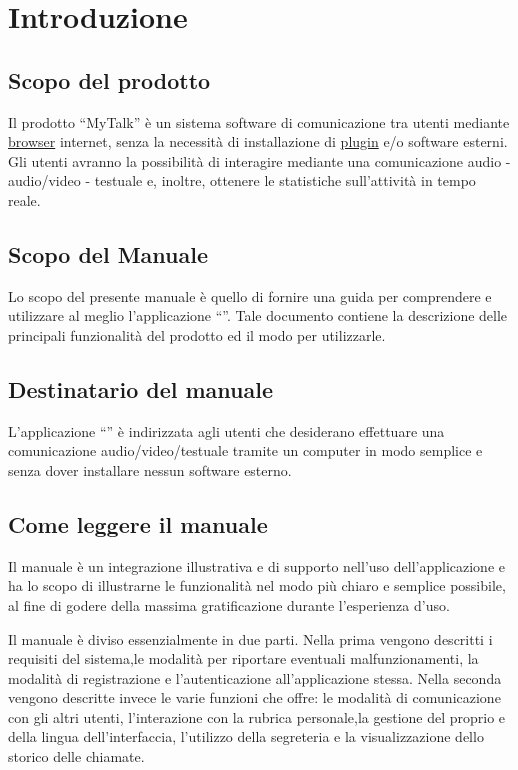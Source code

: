 


\setcounter{page}{1}
\pagestyle{normal}

\section{Introduzione}
\subsection{Scopo del prodotto}
Il prodotto ``MyTalk'' è un sistema software di comunicazione tra utenti mediante \underline{browser} internet, senza la necessità di installazione di \underline{plugin} e/o software esterni. Gli utenti avranno la possibilità di interagire mediante una comunicazione audio - audio/video - testuale e, inoltre, ottenere le statistiche sull'attività in tempo reale.

\subsection{Scopo del Manuale}
Lo scopo del presente manuale è quello di fornire una guida per comprendere e utilizzare al meglio l'applicazione ``\caName''.
Tale documento contiene la descrizione delle principali funzionalità del prodotto ed il modo
per utilizzarle.

\subsection{Destinatario del manuale}
L'applicazione  ``\caName'' è indirizzata agli utenti che desiderano effettuare una comunicazione audio/video/testuale tramite un computer in modo semplice  e senza dover installare nessun software esterno.  

\subsection{Come leggere il manuale}
Il manuale è un integrazione illustrativa e di supporto nell'uso dell'applicazione \caName e ha lo scopo di illustrarne le funzionalità nel modo più chiaro e semplice possibile, al fine di godere della massima gratificazione durante l'esperienza d'uso.

Il manuale è diviso essenzialmente in due parti.
Nella prima vengono descritti i requisiti del sistema,le modalità per riportare eventuali malfunzionamenti, la modalità di registrazione e l'autenticazione all'applicazione stessa. 
Nella seconda vengono descritte invece le varie funzioni che \caName offre: le modalità di comunicazione con gli altri utenti, l'interazione con la rubrica personale,la gestione del proprio \underline{} e della lingua dell'interfaccia, l'utilizzo della segreteria e la visualizzazione dello storico delle chiamate.

